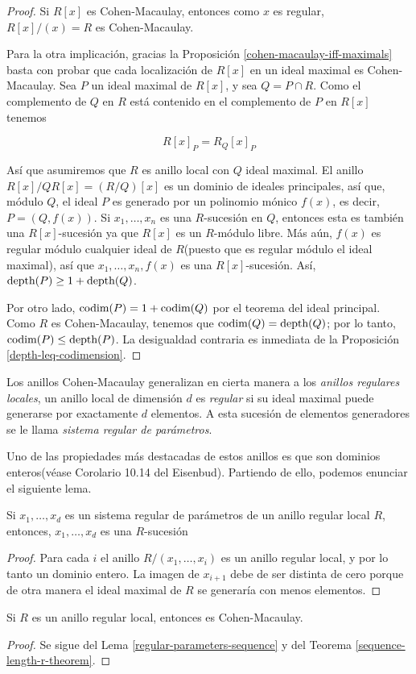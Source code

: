 \begin{proof}
Si $R[x]$ es Cohen-Macaulay, entonces como $x$ es regular, $R[x]/(x) = R$ es Cohen-Macaulay.

Para la otra implicación, gracias la Proposición \ref{cohen-macaulay-iff-maximals} basta con probar que cada localización de $R[x]$ en un ideal maximal es Cohen-Macaulay. Sea $P$ un ideal maximal de $R[x]$, y sea $Q = P\cap R$. Como el complemento de $Q$ en $R$ está contenido en el complemento de $P$ en $R[x]$ tenemos

$$ R[x]_P = R_Q[x]_P $$

Así que asumiremos que $R$ es anillo local con $Q$ ideal maximal. El anillo $R[x]/QR[x] = (R/Q)[x]$ es un dominio de ideales principales, así que, módulo $Q$, el ideal $P$ es generado por un polinomio mónico $f(x)$, es decir, $P=(Q,f(x))$. Si $x_1, \dots, x_n$ es una $R$-sucesión en $Q$, entonces esta es también una $R[x]$-sucesión ya que $R[x]$ es un $R$-módulo libre. Más aún, $f(x)$ es regular módulo cualquier ideal de $R$(puesto que es regular módulo el ideal maximal), así que $x_1,\dots,x_n,f(x)$ es una $R[x]$-sucesión. Así, $\textrm{depth}(P) \geq 1+\textrm{depth}(Q)$.

Por otro lado, $\textrm{codim}(P) = 1 + \textrm{codim}(Q)$ por el teorema del ideal principal. Como $R$ es Cohen-Macaulay, tenemos que $\textrm{codim}(Q) = \textrm{depth}(Q)$; por lo tanto, $\textrm{codim}(P) \leq \textrm{depth}(P)$. La desigualdad contraria es inmediata de la Proposición \ref{depth-leq-codimension}.
\end{proof}

Los anillos Cohen-Macaulay generalizan en cierta manera a los \emph{anillos regulares locales}, un anillo local de dimensión $d$ es \emph{regular} si su ideal maximal puede generarse por exactamente $d$ elementos. A esta sucesión de elementos generadores se le llama \emph{sistema regular de parámetros}.

Uno de las propiedades más destacadas de estos anillos es que son dominios enteros(véase Corolario 10.14 del Eisenbud). Partiendo de ello, podemos enunciar el siguiente lema.

\begin{lemma}\label{regular-parameters-sequence}
Si $x_1, \dots, x_d$ es un sistema regular de parámetros de un anillo regular local $R$, entonces, $x_1,\dots, x_d$ es una $R$-sucesión
\end{lemma}

\begin{proof}
Para cada $i$ el anillo $R/(x_1,\dots,x_i)$ es un anillo regular local, y por lo tanto un dominio entero. La imagen de $x_{i+1}$ debe de ser distinta de cero porque de otra manera el ideal maximal de $R$ se generaría con menos elementos.
\end{proof} 

\begin{corollary}
Si $R$ es un anillo regular local, entonces es Cohen-Macaulay.
\end{corollary}

\begin{proof}
Se sigue del Lema \ref{regular-parameters-sequence} y del Teorema \ref{sequence-length-r-theorem}.
\end{proof}